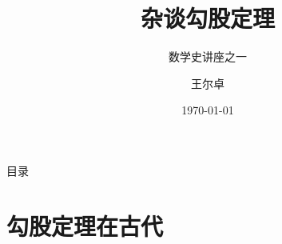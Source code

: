 \documentclass{beamer}
\title{杂谈勾股定理}
\subtitle{数学史讲座之一}
\institute{九章学堂}
\author{王尔卓}
\date{\today}
\begin{document}


\begin{frame}
    \titlepage
\end{frame}

\begin{frame}{目录}
    \tableofcontents
\end{frame}

\section{勾股定理在古代}
\end{document}
